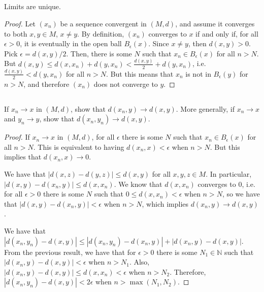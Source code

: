 
\subsection{} Limits are unique.

\begin{proof}
Let $(x_n)$ be a sequence convergent in $(M,d)$, and assume it converges to both $x,y \in M$, $x \neq y$. By definition, $(x_n)$ converges to $x$ if and only if, for all $\epsilon > 0$, it is eventually in the open ball $B_\epsilon(x)$. Since $x \neq y$, then $d(x,y) > 0$. Pick $\epsilon = d(x,y) / 2$. Then, there is some $N$ such that $x_n \in B_\epsilon(x)$ for all $n>N$. But $d(x,y) \leq d(x,x_n) + d(y,x_n) < \frac{d(x,y)}{2} + d(y, x_n)$, i.e. $\frac{d(x,y)}{2} < d(y,x_n)$ for all $n>N$. But this means that $x_n$ is not in $B_\epsilon(y)$ for $n>N$, and therefore $(x_n)$ does not converge to $y$. 
\end{proof}


\subsection{} If $x_n \rightarrow x$ in $(M,d)$, show that $d(x_n, y) \rightarrow d(x,y)$. More generally, if $x_n \rightarrow x$ and $y_n \rightarrow y$, show that $d(x_n, y_n) \rightarrow d(x,y)$.

\begin{proof}
If $x_n \rightarrow x$ in $(M,d)$, for all $\epsilon$ there is some $N$ such that $x_n \in B_\epsilon(x)$ for all $n>N$. This is equivalent to having $d(x_n,x) < \epsilon$ when $n>N$. But this implies that $d(x_n, x) \rightarrow 0$. 

We have that $|d(x,z) - d(y,z)| \leq d(x,y)$ for all $x,y,z \in M$. In particular, $|d(x,y) - d(x_n,y)| \leq d(x,x_n)$. We know that $d(x,x_n)$ converges to 0, i.e. for all $\epsilon>0$ there is some $N$ such that $0 \leq d(x,x_n) < \epsilon$ when $n>N$, so we have that $|d(x,y) - d(x_n,y)| < \epsilon$ when $n>N$, which implies $d(x_n,y) \rightarrow d(x,y)$.



We have that $|d(x_n,y_n) - d(x,y)| \leq |d(x_n, y_n) - d(x_n, y)| + |d(x_n,y)-d(x,y)|$. From the previous result, we have that for $\epsilon > 0$ there is some $N_1 \in \mathbb{N}$ such that $|d(x_n,y)-d(x,y)| < \epsilon$ when $n>N_1$. Also, $|d(x_n,y)-d(x,y)| \leq d(x, x_n) < \epsilon$ when $n>N_2$. Therefore, $|d(x_n,y_n) - d(x,y)| < 2\epsilon$ when $n > \max(N_1, N_2)$.



\end{proof}


